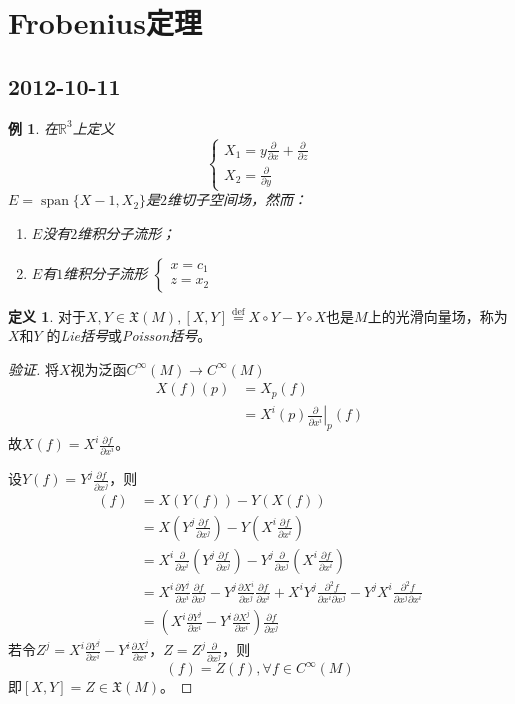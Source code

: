 \documentclass[winfonts,UTF8,c5size,a4paper,fancyhdr,hyperref,titlepage,nocap]{ctexart}
\newtheorem{exa}[thm]{例}
\theoremstyle{definition}
\newtheorem{defn}[thm]{定义}
\theoremstyle{remark}
\numberwithin{equation}{subsection}
\newcommand{\Real}{\mathbb{R}}
\newcommand{\red}{\color{red}}
\newcommand{\pfrac}[2]{\frac{\partial{#1}}{\partial{#2}}}
\newcommand{\px}[1]{\left.\pfrac{}{x^{#1}}\right|_p}
\newcommand{\spa}{\operatorname{span}}
\newcommand{\Xf}[1]{\mathfrak{X}(#1)}
\newcommand{\defeq}{\stackrel{{\mathrm{def}}}{=}}
\begin{document}
\section{Frobenius定理}
\subsection*{2012-10-11}
\begin{exa}
  在$\Real^3$上定义
\begin{equation*}
\begin{cases}
X_1=y\pfrac{}{x}+\pfrac{}{z}\\
X_2=\pfrac{}{y}
\end{cases}
\end{equation*}
$E=\spa\{X-1,X_2\}$是$2$维切子空间场，然而：
\begin{enumerate}[1)]
    \setlength{\itemindent}{2ex}
    \item $E$没有$2$维积分子流形；
    \item $E$有$1$维积分子流形
$\begin{cases}
x=c_1\\
z=x_2
\end{cases}$
\end{enumerate}
\end{exa}
\begin{defn}\label{Lie括号}
  对于$X,Y\in \Xf{M}, [X,Y]\defeq X\circ Y-Y\circ X$也是$M$上的光滑向量场，称为$X$和$Y$ 的\emph{\red Lie括号}或\emph{\red Poisson括号}。
\end{defn}
\begin{proof}[验证]
将$X$视为泛函$C^{\infty}(M)\to C^{\infty}(M)$
\begin{align*}
X(f)(p)&=X_p(f)\\
       &=X^i(p)\px{i}(f)
\end{align*}
故$X(f)=X^i\pfrac{f}{x^i}$。

设$Y(f)=Y^j\pfrac{f}{x^j}$，则
\begin{align*}
[X,Y](f)&=X(Y(f))-Y(X(f))\\
        &=X(Y^j\pfrac{f}{x^j})-Y(X^i\pfrac{f}{x^i})\\
        &=X^i\pfrac{}{x^i}(Y^j\pfrac{f}{x^j})-Y^j\pfrac{}{x^j}(X^i\pfrac{f}{x^i})\\
        &=X^i\pfrac{Y^j}{x^i}\pfrac{f}{x^j}-Y^j\pfrac{X^i}{x^j}\pfrac{f}{x^i}+X^iY^j\frac{\partial^2{f}}{\partial{x^i}\partial{x^j}}-Y^jX^i\frac{\partial^2{f}}{\partial{x^j}\partial{x^i}}\\
        &=(X^i\pfrac{Y^j}{x^i}-Y^i\pfrac{X^j}{x^i})\pfrac{f}{x^j}
\end{align*}
若令$Z^j=X^i\pfrac{Y^j}{x^i}-Y^i\pfrac{X^j}{x^i}$，$Z=Z^j\pfrac{}{x^j}$，则
\begin{equation*}
[X,Y](f)=Z(f),\forall f\in C^{\infty}(M)
\end{equation*}
即$[X,Y]=Z\in\Xf{M}$。
\end{proof}
\end{document}
